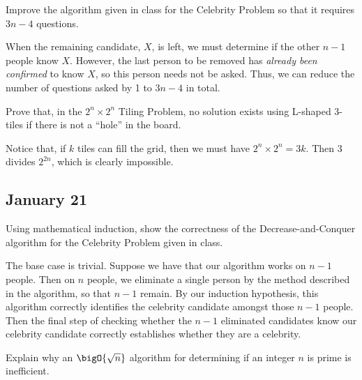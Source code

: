 \documentclass[draft]{article}
\begin{document}
\begin{question}
    Improve the algorithm given in class for the Celebrity Problem so that it requires $3n - 4$ questions.
\end{question}

\begin{solution}
    When the remaining candidate, $X$, is left, we must determine if the other $n - 1$ people know $X$. However, the last person to be removed has \emph{already been confirmed} to know $X$, so this person needs not be asked. Thus, we can reduce the number of questions asked by 1 to $3n - 4$ in total.
\end{solution}

\begin{question}
    Prove that, in the $2^n \times 2^n$ Tiling Problem, no solution exists using L-shaped 3-tiles if there is not a ``hole'' in the board.
\end{question}

\begin{solution}
    Notice that, if $k$ tiles can fill the grid, then we must have $2^n \times 2^n = 3k$. Then $3$ divides $2^{2n}$, which is clearly impossible.
\end{solution}

\subsection{January 21}
\begin{question}
    Using mathematical induction, show the correctness of the Decrease-and-Conquer algorithm for the Celebrity Problem given in class.
\end{question}

\begin{solution}
    The base case is trivial. Suppose we have that our algorithm works on $n - 1$ people. Then on $n$ people, we eliminate a single person by the method described in the algorithm, so that $n - 1$ remain. By our induction hypothesis, this algorithm correctly identifies the celebrity candidate amongst those $n - 1$ people. Then the final step of checking whether the $n - 1$ eliminated candidates know our celebrity candidate correctly establishes whether they are a celebrity.
\end{solution}

\begin{question}
    Explain why an $\bigO{\sqrt{n}}$ algorithm for determining if an integer $n$ is prime is inefficient.
\end{question}
\end{document}
